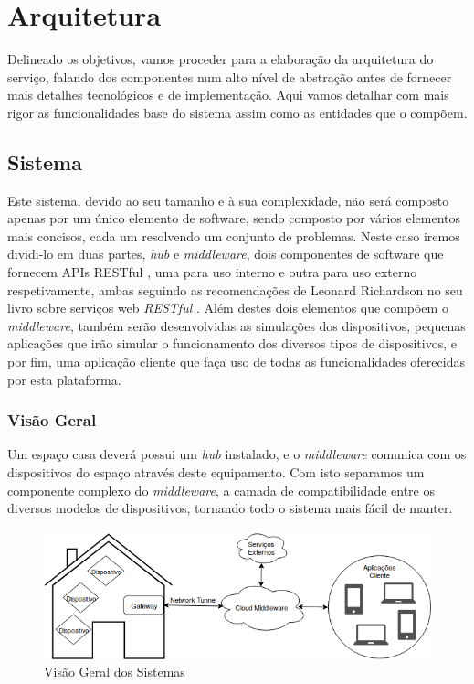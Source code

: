 \chapter{Arquitetura}

Delineado os objetivos, vamos proceder para a elaboração da arquitetura do serviço, falando dos componentes num alto nível de abstração antes de fornecer mais detalhes tecnológicos e de implementação. Aqui vamos detalhar com mais rigor as funcionalidades base do sistema assim como as entidades que o compõem.

\section{Sistema}

Este sistema, devido ao seu tamanho e à sua complexidade, não será composto apenas por um único elemento de software, sendo composto por vários elementos mais concisos, cada um resolvendo um conjunto de problemas. Neste caso iremos dividi-lo em duas partes, \textit{hub} e \textit{middleware}, dois componentes de software que fornecem APIs RESTful , uma para uso interno e outra para uso externo respetivamente, ambas seguindo as recomendações de Leonard Richardson no seu livro sobre serviços web \textit{RESTful} \cite{richardson2013restful}. Além destes dois elementos que compõem o \textit{middleware}, também serão desenvolvidas as simulações dos dispositivos, pequenas aplicações que irão simular o funcionamento dos diversos tipos de dispositivos, e por fim, uma aplicação cliente que faça uso de todas as funcionalidades oferecidas por esta plataforma.

\subsection{Visão Geral}

Um espaço casa deverá possui um \textit{hub} instalado, e o \textit{middleware} comunica com os dispositivos do espaço através deste equipamento. Com isto separamos um componente complexo do \textit{middleware}, a camada de compatibilidade entre os diversos modelos de dispositivos, tornando todo o sistema mais fácil de manter.

\begin{figure}[H]
  \centering
        \includegraphics[scale=0.7]{img/arquitetura.png}
  \caption{Visão Geral dos Sistemas}
\end{figure}

